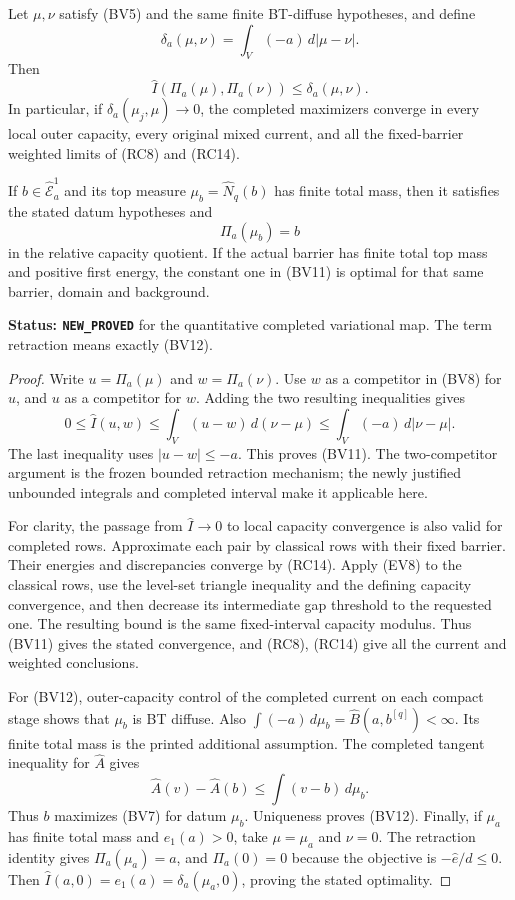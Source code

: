 \begin{theorem}
\label{thm:r11-completed-barrier-data-stability}
Let $\mu,\nu$ satisfy (BV5) and the same
finite BT-diffuse hypotheses, and define
\[
                    \delta_a(\mu,\nu)
                         =\int_V(-a)\,d|\mu-\nu|.
 \tag{BV10}
\]
Then
\[
 \widehat I(\Pi_a(\mu),\Pi_a(\nu))
       \leq\delta_a(\mu,\nu).
 \tag{BV11}
\]
In particular, if $\delta_a(\mu_j,\mu)\to0$,
the completed maximizers converge in every
local outer capacity, every original mixed
current, and all the fixed-barrier weighted
limits of (RC8) and (RC14).

If $b\in\widehat{\mathcal E}^1_a$ and its top
measure $\mu_b=\widehat N_q(b)$ has finite
total mass, then it satisfies the stated
datum hypotheses and
\[
                                \Pi_a(\mu_b)=b
 \tag{BV12}
\]
in the relative capacity quotient.
If the actual barrier has finite total top mass
and positive first energy, the constant one
in (BV11) is optimal for that same barrier,
domain and background.
\end{theorem}

\noindent\textbf{Status: \texttt{NEW\_PROVED}}
for the quantitative completed variational map.
The term retraction means exactly (BV12).

\begin{proof}
Write $u=\Pi_a(\mu)$ and $w=\Pi_a(\nu)$.
Use $w$ as a competitor in (BV8) for $u$,
and $u$ as a competitor for $w$.
Adding the two resulting inequalities gives
\[
 0\leq\widehat I(u,w)
       \leq\int_V(u-w)\,d(\nu-\mu)
       \leq\int_V(-a)\,d|\nu-\mu|.
\]
The last inequality uses $|u-w|\leq-a$.
This proves (BV11).  The two-competitor argument
is the frozen bounded retraction mechanism;
the newly justified unbounded integrals and
completed interval make it applicable here.

For clarity, the passage from $\widehat I\to0$
to local capacity convergence is also valid
for completed rows.  Approximate each pair
by classical rows with their fixed barrier.
Their energies and discrepancies converge
by (RC14).  Apply (EV8) to the classical
rows, use the level-set triangle inequality
and the defining capacity convergence, and
then decrease its intermediate gap threshold
to the requested one.  The resulting bound
is the same fixed-interval capacity modulus.
Thus (BV11) gives the stated convergence,
and (RC8), (RC14) give all the current
and weighted conclusions.

For (BV12), outer-capacity control of the
completed current on each compact stage
shows that $\mu_b$ is BT diffuse.
Also
$\int(-a)\,d\mu_b=\widehat B(a,b^{[q]})<\infty$.
Its finite total mass is the printed
additional assumption.
The completed tangent inequality for
$\widehat A$ gives
\[
 \widehat A(v)-\widehat A(b)
                    \leq\int(v-b)\,d\mu_b .
\]
Thus $b$ maximizes (BV7) for datum $\mu_b$.
Uniqueness proves (BV12).
Finally, if $\mu_a$ has finite total mass and
$e_1(a)>0$, take $\mu=\mu_a$ and $\nu=0$.
The retraction identity gives $\Pi_a(\mu_a)=a$,
and $\Pi_a(0)=0$ because the objective is
$-\widehat e/d\leq0$.
Then
$\widehat I(a,0)=e_1(a)=\delta_a(\mu_a,0)$,
proving the stated optimality.
\end{proof}

